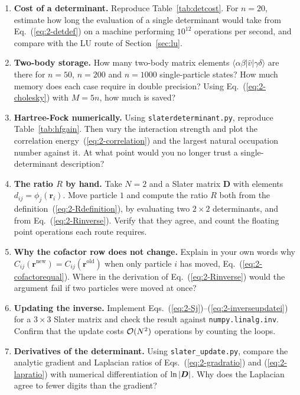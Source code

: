 \begin{enumerate}
\item \textbf{Cost of a determinant.}
  Reproduce Table~\ref{tab:detcost}.  For $n=20$, estimate how long the
  evaluation of a single determinant would take from
  Eq.~(\ref{eq:2-detdef}) on a machine performing $10^{12}$ operations per
  second, and compare with the LU route of Section~\ref{sec:lu}.

\item \textbf{Two-body storage.}
  How many two-body matrix elements $\langle\alpha\beta|\hat{v}|\gamma\delta
  \rangle$ are there for $n=50$, $n=200$ and $n=1000$ single-particle states?
  How much memory does each case require in double precision?  Using
  Eq.~(\ref{eq:2-cholesky}) with $M=5n$, how much is saved?

\item \textbf{Hartree-Fock numerically.}
  Using \texttt{slaterdeterminant.py}, reproduce Table~\ref{tab:hfgain}.
  Then vary the interaction strength and plot the correlation
  energy~(\ref{eq:2-correlation}) and the largest natural occupation number
  against it.  At what point would you no longer trust a single-determinant
  description?


\item \textbf{The ratio $R$ by hand.}
  Take $N=2$ and a Slater matrix $\bm{D}$ with elements
  $d_{ij}=\phi_j(\bm{r}_i)$.  Move particle $1$ and compute the ratio
  $R$ both from the definition~(\ref{eq:2-Rdefinition}), by evaluating
  two $2\times2$ determinants, and from
  Eq.~(\ref{eq:2-Rinverse}).  Verify that they agree, and count the
  floating point operations each route requires.

\item \textbf{Why the cofactor row does not change.}
  Explain in your own words why $C_{ij}(\bm{r}^{\mathrm{new}})=
  C_{ij}(\bm{r}^{\mathrm{old}})$ when only particle $i$ has moved,
  Eq.~(\ref{eq:2-cofactorequal}).  Where in the derivation of
  Eq.~(\ref{eq:2-Rinverse}) would the argument fail if two particles were
  moved at once?

\item \textbf{Updating the inverse.}
  Implement Eqs.~(\ref{eq:2-Sj})--(\ref{eq:2-inverseupdatei}) for a
  $3\times3$ Slater matrix and check the result against
  \texttt{numpy.linalg.inv}.  Confirm that the update costs $\mathcal{O}(N^2)$
  operations by counting the loops.

\item \textbf{Derivatives of the determinant.}
  Using \texttt{slater\_update.py}, compare the analytic gradient and
  Laplacian ratios of Eqs.~(\ref{eq:2-gradratio}) and (\ref{eq:2-lapratio})
  with numerical differentiation of $\ln{|\boldsymbol{D}|}$.  Why does the Laplacian
  agree to fewer digits than the gradient?


\end{enumerate}
